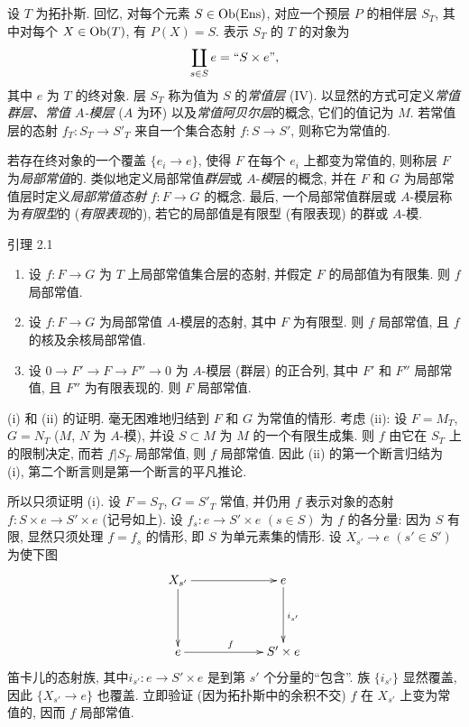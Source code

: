 \setcounter{subsection}{-1}
\subsection{}
设 $T$ 为拓扑斯. 回忆, 对每个元素 $S\in \operatorname{Ob} (\operatorname{Ens})$,
对应一个预层 $P$ 的相伴层 $S_T$, 其中对每个 $X\in \operatorname{Ob} (T)$, 有 $P(X)=S$.
表示 $S_T$ 的 $T$ 的对象为
$$
\coprod_{s\in S}e= ``S\times e \mbox{''}{},
$$
其中 $e$ 为 $T$ 的终对象.
层 $S_T$ 称为值为 $S$ 的\emph{常值层} (IV).
以显然的方式可定义\emph{常值群层、常值 $A$-模层} ($A$ 为环)
以及\emph{常值阿贝尔层}的概念, 它们的值记为 $M$.
若常值层的态射 $f_T:S_T\rightarrow S'_T$ 来自一个集合态射
$f:S\rightarrow S'$, 则称它为常值的.

若存在终对象的一个覆盖 $\{e_i\rightarrow e\}$,
使得 $F$ 在每个 $e_i$ 上都变为常值的, 则称层 $F$ 为\emph{局部常值}的.
类似地\pageoriginale 定义局部常值\emph{群层}或 $A$-\emph{模}层的概念,
并在 $F$ 和 $G$ 为局部常值层时定义\emph{局部常值态射} $f:F\rightarrow G$ 的概念.
最后, 一个局部常值群层或 $A$-模层称为\emph{有限型}的
(\resp \emph{有限表现}的), 若它的局部值是有限型
(\resp 有限表现) 的群或 $A$-模.

\begin{enonce*}{引理 2.1}
\begin{enumerate}
\renewcommand{\theenumi}{\roman{enumi}}
\renewcommand{\labelenumi}{(\theenumi)}
\item 设 $f:F\rightarrow G$ 为 $T$ 上局部常值集合层的态射,
并假定 $F$ 的局部值为有限集. 则 $f$ 局部常值.

\item 设 $f:F\rightarrow G$ 为局部常值 $A$-模层的态射,
其中 $F$ 为有限型. 则 $f$ 局部常值, 且 $f$ 的核及余核局部常值.

\item 设 $0\rightarrow F'\rightarrow F\rightarrow F''\rightarrow 0$
为 $A$-模层 (\resp 群层) 的正合列,
其中 $F'$ 和 $F''$ 局部常值, 且 $F''$ 为有限表现的.
则 $F$ 局部常值.
\end{enumerate}
\end{enonce*}

(i) 和 (ii) 的证明. 毫无困难地归结到 $F$ 和 $G$ 为常值的情形.
考虑 (ii): 设 $F=M_T$, $G=N_T$ ($M$, $N$ 为 $A$-模),
并设 $S\subset M$ 为 $M$ 的一个有限生成集.
则 $f$ 由它在 $S_T$ 上的限制决定,
而若 $f|S_T$ 局部常值, 则 $f$ 局部常值.
因此 (ii) 的第一个断言归结为 (i), 第二个断言则是第一个断言的平凡推论.

所以只须证明 (i).
设 $F=S_T$, $G={S'}_T$ 常值, 并仍用 $f$ 表示对象的态射
$f:S\times e\rightarrow S'\times e$ (记号如上).
设 $f_s:e\rightarrow S'\times e$ $(s\in S)$ 为 $f$ 的各分量:
因为 $S$ 有限, 显然只须处理 $f=f_s$ 的情形,
即 $S$ 为单元素集的情形.
设 $X_{s'}\rightarrow e$ $(s'\in S')$ 为使下图
$$
\xymatrix@C=2cm@R=1.5cm{
X_{s'} \ar[r] \ar[d]& e\ar[d]^{i_{s'}}\\
e   \ar[r]^{f}   & S'\times e
}
$$
笛卡儿的态射族,
其中\pageoriginale $i_{s'}:e\rightarrow S'\times e$ 是到第 $s'$ 个分量的“包含”.
族 $\{i_{s'}\}$ 显然覆盖, 因此 $\{X_{s'}\rightarrow e\}$ 也覆盖.
立即验证 (因为拓扑斯中的余积不交)
$f$ 在 $X_{s'}$ 上变为常值的, 因而 $f$ 局部常值.

